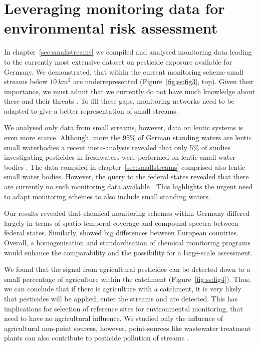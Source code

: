 \section{Leveraging monitoring data for environmental risk assessment}
In chapter~\ref{sec:smallstreams} we compiled and analysed monitoring data  leading to the currently most extensive dataset on pesticide exposure available for Germany. 
We demonstrated, that within the current monitoring scheme small streams below $10~km^2$ are underrepresented (Figure~\ref{fig:ss:fig3}, top).
Given their importance, we must admit that we currently do not have much knowledge about these and their threats \citep{biggs_importance_2016, lorenz_specifics_2016}. 
To fill these gaps, monitoring networks need to be adapted to give a better representation of small streams. 

We analysed only data from small streams, however, data on lentic systems is even more scarce. 
Although, more the 95\% of German standing waters are lentic small waterbodies a recent meta-analysis revealed that only 5\% of studies investigating pesticides in freshwaters were performed on lentic small water bodies \citet{lorenz_specifics_2016}.
The data compiled in chapter~\ref{sec:smallstreams} comprised also lentic small water bodies.
However, the query to the federal states revealed that there are currently no such monitoring data available \citep{brinke_umsetzung_2016}. 
This highlights the urgent need to adapt monitoring schemes to also include small standing waters.

Our results revealed that chemical monitoring schemes within Germany differed largely in terms of spatio-temporal coverage and compound spectra between federal states. 
Similarly, \citet{malaj_organic_2014} showed big differences between European countries.
Overall, a homogenisation and standardisation of chemical monitoring programs  would enhance the comparability and the possibility for a large-scale assessment.

We found that the signal from agricultural pesticides can be detected down to a small percentage of agriculture within the catchment (Figure~\ref{fig:ss:fig4}).
Thus, we can conclude that if there is agriculture with a catchment, it is very likely that pesticides will be applied, enter the streams and are detected.
This has implications for selection of reference sites for environmental monitoring, that need to have no agricultural influence.
We studied only the influence of agricultural non-point sources, however, point-sources like wastewater treatment plants can also contribute to pesticide pollution of streams \citep{bunzel_landscape_2014}.

